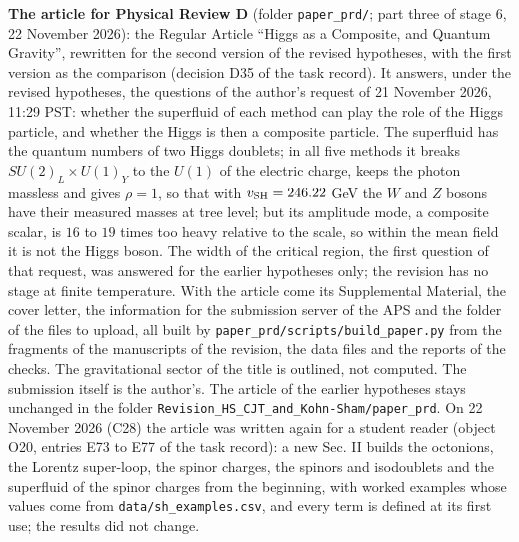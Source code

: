\documentclass[
  10pt,
]{article}
\begin{document}
\textbf{The article for Physical Review D} (folder \texttt{paper\_prd/};
part three of stage 6, 22 November 2026): the Regular Article ``Higgs as
a Composite, and Quantum Gravity'', rewritten for the second version of
the revised hypotheses, with the first version as the comparison
(decision D35 of the task record). It answers, under the revised
hypotheses, the questions of the author's request of 21 November 2026,
11:29 PST: whether the superfluid of each method can play the role of
the Higgs particle, and whether the Higgs is then a composite particle.
The superfluid has the quantum numbers of two Higgs doublets; in all
five methods it breaks \(SU(2)_L\times U(1)_Y\) to the \(U(1)\) of the
electric charge, keeps the photon massless and gives \(\rho=1\), so that
with \(v_{\rm SH}=246.22\) GeV the \(W\) and \(Z\) bosons have their
measured masses at tree level; but its amplitude mode, a composite
scalar, is \(16\) to \(19\) times too heavy relative to the scale, so
within the mean field it is not the Higgs boson. The width of the
critical region, the first question of that request, was answered for
the earlier hypotheses only; the revision has no stage at finite
temperature. With the article come its Supplemental Material, the cover
letter, the information for the submission server of the APS and the
folder of the files to upload, all built by
\texttt{paper\_prd/scripts/build\_paper.py} from the fragments of the
manuscripts of the revision, the data files and the reports of the
checks. The gravitational sector of the title is outlined, not computed.
The submission itself is the author's. The article of the earlier
hypotheses stays unchanged in the folder
\texttt{Revision\_HS\_CJT\_and\_Kohn-Sham/paper\_prd}. On 22 November
2026 (C28) the article was written again for a student reader (object
O20, entries E73 to E77 of the task record): a new Sec. II builds the
octonions, the Lorentz super-loop, the spinor charges, the spinors and
isodoublets and the superfluid of the spinor charges from the beginning,
with worked examples whose values come from
\texttt{data/sh\_examples.csv}, and every term is defined at its first
use; the results did not change.
\end{document}
